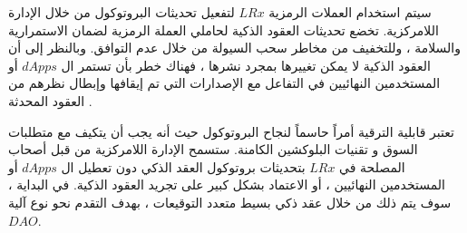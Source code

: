 \documentclass[12pt, a4paper, leqno]{report}
\theoremstyle{plain}
\theoremstyle{definition}
\begin{document}
\begin{multicols}{2}
\begin{otherlanguage}{arabic}
سيتم استخدام العملات الرمزية $LRx$ لتفعيل تحديثات البروتوكول من خلال الإدارة اللامركزية. تخضع تحديثات العقود الذكية لحاملي العملة الرمزية لضمان الاستمرارية والسلامة ، وللتخفيف من مخاطر سحب السيولة من خلال عدم التوافق. وبالنظر إلى أن العقود الذكية لا يمكن تغييرها بمجرد نشرها ، فهناك خطر بأن تستمر ال $dApps$ أو المستخدمين النهائيين في التفاعل مع الإصدارات التي تم إيقافها وإبطال نظرهم من العقود المحدثة .

تعتبر قابلية الترقية أمراً حاسماً لنجاح البروتوكول حيث أنه يجب أن يتكيف مع متطلبات السوق و تقنيات البلوكشين الكامنة. ستسمح الإدارة اللامركزية من قبل أصحاب المصلحة في $LRx$ بتحديثات بروتوكول العقد الذكي دون تعطيل ال $dApps$ أو المستخدمين النهائيين ، أو الاعتماد بشكل كبير على تجريد العقود الذكية. في البداية ، سوف يتم ذلك من خلال عقد ذكي بسيط متعدد التوقيعات ، بهدف التقدم نحو نوع آلية $DAO$.
\end{otherlanguage}
\end{multicols}

\end{document}
